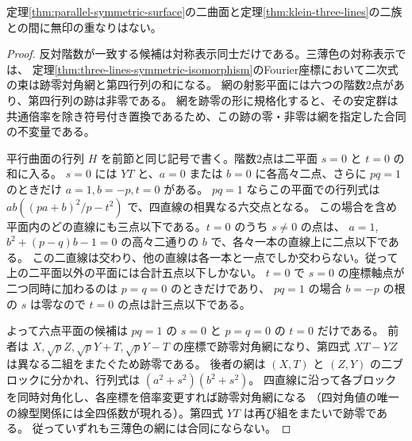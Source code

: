 \begin{proposition}
定理\ref{thm:parallel-symmetric-surface}の二曲面と定理\ref{thm:klein-three-lines}の二族との間に無印の重なりはない。
\end{proposition}
\begin{proof}
反対階数が一致する候補は対称表示同士だけである。三薄色の対称表示では、
定理\ref{thm:three-lines-symmetric-isomorphism}のFourier座標において二次式の束は跡零対角網と第四行列の和になる。
網の射影平面には六つの階数2点があり、第四行列の跡は非零である。
網を跡零の形に規格化すると、その安定群は共通倍率を除き符号付き置換であるため、この跡の零・非零は網を指定した合同の不変量である。

平行曲面の行列 $H$ を前節と同じ記号で書く。階数2点は二平面 $s=0$ と $t=0$ の和に入る。
$s=0$ には $YT$ と、$a=0$ または $b=0$ に各高々二点、さらに $pq=1$ のときだけ $a=1,b=-p,t=0$ がある。
$pq=1$ ならこの平面での行列式は $ab((pa+b)^2/p-t^2)$ で、四直線の相異なる六交点となる。
この場合を含め平面内のどの直線にも三点以下である。$t=0$ のうち $s\ne0$ の点は、
$a=1$, $b^2+(p-q)b-1=0$ の高々二通りの $b$ で、各々一本の直線上に二点以下である。
この二直線は交わり、他の直線は各一本と一点でしか交わらない。従って上の二平面以外の平面には合計五点以下しかない。
$t=0$ で $s=0$ の座標軸点が二つ同時に加わるのは $p=q=0$ のときだけであり、
$pq=1$ の場合 $b=-p$ の根の $s$ は零なので $t=0$ の点は計三点以下である。

よって六点平面の候補は $pq=1$ の $s=0$ と $p=q=0$ の $t=0$ だけである。
前者は $X,\sqrt p Z,\sqrt p Y+T,\sqrt p Y-T$ の座標で跡零対角網になり、第四式 $XT-YZ$ は異なる二組をまたぐため跡零である。
後者の網は $(X,T)$ と $(Z,Y)$ の二ブロックに分かれ、行列式は $(a^2+s^2)(b^2+s^2)$。
四直線に沿って各ブロックを同時対角化し、各座標を倍率変更すれば跡零対角網になる
（四対角値の唯一の線型関係には全四係数が現れる）。第四式 $YT$ は再び組をまたいで跡零である。
従っていずれも三薄色の網には合同にならない。
\end{proof}
